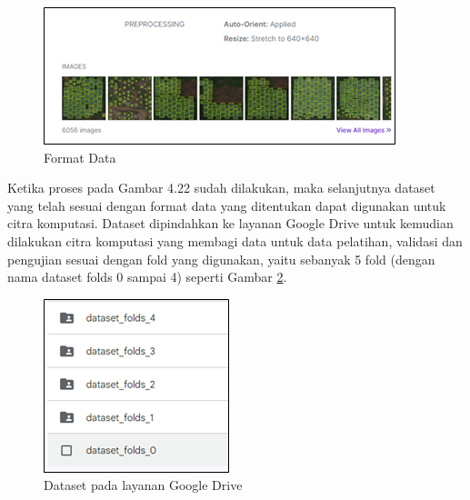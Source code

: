 \begin{figure}[H]
	\vspace{-0.1cm}
	\begin{center}
		\includegraphics[width=1\columnwidth]{bab4/Gambar/Picture22.png}
	\end{center}
	\vspace{-0.2cm}
	\captionsetup{justification=centering}
	\caption{Format Data}\label{img:Format-Data}
\end{figure}

Ketika proses pada Gambar 4.22 sudah dilakukan, maka selanjutnya dataset yang telah sesuai dengan format data yang ditentukan dapat digunakan untuk citra komputasi. Dataset dipindahkan ke layanan Google Drive untuk kemudian dilakukan citra komputasi yang membagi data untuk data pelatihan, validasi dan pengujian sesuai dengan fold yang digunakan, yaitu sebanyak 5 fold (dengan nama dataset folds 0 sampai 4) seperti Gambar \ref{img:Dataset-Pada-Gdrive}.

\begin{figure}[H]
	\vspace{-0.1cm}
	\begin{center}
		\includegraphics[width=0.4\columnwidth]{bab4/Gambar/Picture23.png}
	\end{center}
	\vspace{-0.2cm}
	\captionsetup{justification=centering}
	\caption{Dataset pada layanan Google Drive}\label{img:Dataset-Pada-Gdrive}
\end{figure}

